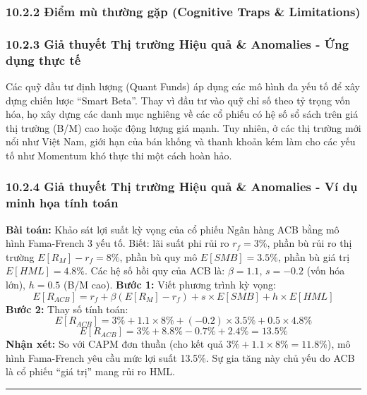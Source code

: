 \documentclass[
]{article}
\begin{document}
\subsubsection{10.2.2 Điểm mù thường gặp (Cognitive Traps \&
Limitations)}\label{ux111iux1ec3m-muxf9-thux1b0ux1eddng-gux1eb7p-cognitive-traps-limitations-79}

\subsubsection{10.2.3 Giả thuyết Thị trường Hiệu quả \& Anomalies - Ứng
dụng thực
tế}\label{giux1ea3-thuyux1ebft-thux1ecb-trux1b0ux1eddng-hiux1ec7u-quux1ea3-anomalies---ux1ee9ng-dux1ee5ng-thux1ef1c-tux1ebf}

Các quỹ đầu tư định lượng (Quant Funds) áp dụng các mô hình đa yếu tố để
xây dựng chiến lược ``Smart Beta''. Thay vì đầu tư vào quỹ chỉ số theo
tỷ trọng vốn hóa, họ xây dựng các danh mục nghiêng về các cổ phiếu có hệ
số sổ sách trên giá thị trường (B/M) cao hoặc động lượng giá mạnh. Tuy
nhiên, ở các thị trường mới nổi như Việt Nam, giới hạn của bán khống và
thanh khoản kém làm cho các yếu tố như Momentum khó thực thi một cách
hoàn hảo.

\subsubsection{10.2.4 Giả thuyết Thị trường Hiệu quả \& Anomalies - Ví
dụ minh họa tính
toán}\label{giux1ea3-thuyux1ebft-thux1ecb-trux1b0ux1eddng-hiux1ec7u-quux1ea3-anomalies---vuxed-dux1ee5-minh-hux1ecda-tuxednh-touxe1n}

\textbf{Bài toán:} Khảo sát lợi suất kỳ vọng của cổ phiếu Ngân hàng ACB
bằng mô hình Fama-French 3 yếu tố. Biết: lãi suất phi rủi ro
\(r_f = 3\%\), phần bù rủi ro thị trường \(E[R_M] - r_f = 8\%\), phần bù
quy mô \(E[SMB] = 3.5\%\), phần bù giá trị \(E[HML] = 4.8\%\). Các hệ số
hồi quy của ACB là: \(\beta = 1.1\), \(s = -0.2\) (vốn hóa lớn),
\(h = 0.5\) (B/M cao). \textbf{Bước 1:} Viết phương trình kỳ vọng:
\[ E[R_{ACB}] = r_f + \beta (E[R_M] - r_f) + s \times E[SMB] + h \times E[HML] \]
\textbf{Bước 2:} Thay số tính toán:
\[ E[R_{ACB}] = 3\% + 1.1 \times 8\% + (-0.2) \times 3.5\% + 0.5 \times 4.8\% \]
\[ E[R_{ACB}] = 3\% + 8.8\% - 0.7\% + 2.4\% = 13.5\% \] \textbf{Nhận
xét:} So với CAPM đơn thuần (cho kết quả
\(3\% + 1.1 \times 8\% = 11.8\%\)), mô hình Fama-French yêu cầu mức lợi
suất 13.5\%. Sự gia tăng này chủ yếu do ACB là cổ phiếu ``giá trị'' mang
rủi ro HML.

\begin{center}\rule{0.5\linewidth}{0.5pt}\end{center}
\end{document}
